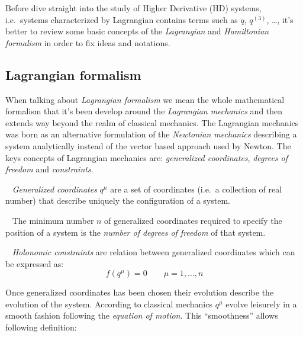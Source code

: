 Before dive straight into the study of Higher Derivative (HD) systems, i.e.\
systems characterized by Lagrangian contains terms such as $\ddot{q}$,
${q}^{(3)}$, \dots, it's better to review some basic concepts of the
\emph{Lagrangian} and \emph{Hamiltonian formalism} in order to fix ideas and
notations.

\subsection{Lagrangian formalism}\label{subsection: lagrangian_formalism}
When talking about \emph{Lagrangian formalism} we mean the whole mathematical
formalism that it's been develop around the \emph{Lagrangian mechanics} and then
extends way beyond the realm of classical mechanics. The Lagrangian mechanics
was born as an alternative formulation of the \emph{Newtonian mechanics}
describing a system analytically instead of the vector based approach used by
Newton. The keys concepts of Lagrangian mechanics are: \emph{generalized
coordinates}, \emph{degrees of freedom} and \emph{constraints}.

\begin{definition}\label{def: generalized coordinates}~\cite{Ginsberg08}
  \emph{Generalized coordinates} $q^{\mu}$ are a set of coordinates (i.e.\ a
  collection of real number) that describe uniquely the configuration of a
  system.
\end{definition}

\begin{definition}\label{def: dof}~\cite{Ginsberg08}
  The minimum number $n$ of generalized coordinates required to specify the
  position of a system is the \emph{number of degrees of freedom} of that
  system.
\end{definition}

\begin{definition}\label{def: holonomic constraints}~\cite{
  Goldstein11_hol_constraints}
  \emph{Holonomic constraints} are relation between generalized coordinates
  which can be expressed as:
  \begin{equation*}
      f(q^{\mu}) = 0 \qquad \mu = 1, \ldots, n
  \end{equation*}
\end{definition}

Once generalized coordinates has been chosen their evolution describe the
evolution of the system. According to classical mechanics $q^{\mu}$ evolve
leisurely in a smooth fashion following the \emph{equation of motion}. This
``smoothness'' allows following definition:

